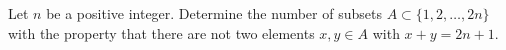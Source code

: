 Let $n$ be a positive integer. Determine the number of subsets $A \subset \{1,2,\ldots,2n\}$
with the property that there are not two elements $x,y \in A$ with $x+y = 2n+1$.
